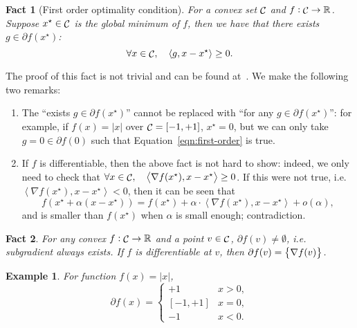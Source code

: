 \documentclass{article}
\newtheorem{example}{Example}
\newtheorem{fact}{Fact}
\DeclareMathOperator*{\Ccal}{{\cal C}}
\newcommand{\RR}{\mathbb{R}} %
\newcommand{\inner}[2]{\left\langle #1,#2 \right\rangle}
\begin{document}
\begin{fact}[First order optimality condition]
For a convex set $\Ccal$ and $f: \Ccal \to \RR$. Suppose $x^\star \in \Ccal$ is the global minimum of $f$, then we have that there exists $g \in \partial f(x^\star)$:
\begin{equation}
   \forall x \in \Ccal, \quad \inner{g}{x - x^\star} \geq 0.
   \label{eqn:first-order}
 \end{equation}
\label{fact:first-order}
\end{fact}
The proof of this fact is not trivial and can be found at~\cite[][Proposition 4.7.2]{bertsekas2003convex}. We make the following two remarks:
\begin{enumerate}
\item The ``exists $g \in \partial f(x^\star)$'' cannot be replaced with ``for any $g \in \partial f(x^\star)$'': for example, if $f(x) = |x|$ over $\Ccal = [-1,+1]$, $x^\star = 0$, but we can only take $g = 0 \in \partial f(0)$ such that Equation~\eqref{eqn:first-order} is true.
\item If $f$ is differentiable, then the above fact is not hard to show: indeed, we only need to check that $\forall x \in \Ccal, \quad \inner{\nabla f(x^\star)}{x - x^\star} \geq 0$. If this were not true, i.e. $\inner{\nabla f(x^\star)}{x - x^\star} < 0$, then it can be seen that
\[ f(x^\star + \alpha(x - x^\star)) = f(x^\star) + \alpha \cdot \inner{\nabla f(x^\star)}{x - x^\star} + o(\alpha), \]
and is smaller than $f(x^\star)$ when $\alpha$ is small enough; contradiction.
\end{enumerate}



\begin{fact}
For any convex $f: \Ccal \to \RR$ and a point $v \in \Ccal$, $\partial f(v) \neq \emptyset$, i.e. subgradient always exists. If $f$ is differentiable at $v$, then $\partial f(v) = \cbr{\nabla f(v)}$.
\end{fact}

\begin{example}
For function $f(x) = |x|$,
\[ \partial f(x) = \begin{cases} +1 & x > 0, \\ [-1,+1] & x = 0, \\ -1 & x < 0. \end{cases}\]
\end{example}
\end{document}
